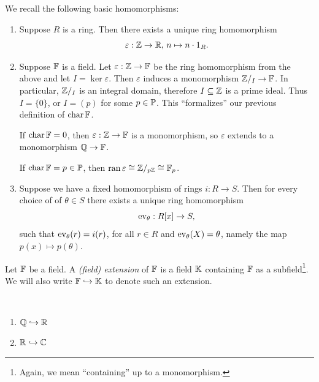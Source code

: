\begin{example}
    We recall the following basic homomorphisms:
    \begin{enumerate}
        \item Suppose $R$ is a ring. Then there exists a unique ring homomorphism
        \[
            \varepsilon : \Z \to \R, \, n \mapsto n \cdot 1_R.
        \]

        \item Suppose $\F$ is a field. Let $\varepsilon : \Z \to \F$ be the ring homomorphism from the above and let $I = \ker \varepsilon$. Then $\varepsilon$ induces a monomorphism $\Z/_I \to \F$. In particular, $\Z/_I$ is an integral domain, therefore $I \subseteq \Z$ is a prime ideal. Thus $I = \{0\}$, or $I = (p)$ for some $p \in \P$. This ``formalizes'' our previous definition of $\characteristic \F$.
        
        If $\characteristic \F = 0$, then $\varepsilon : \Z \to \F$ is a monomorphism, so $\varepsilon$ extends to a monomorphism $\Q \to \F$.

        If $\characteristic \F = p \in \P$, then $\ran \varepsilon \cong \Z/_{p\Z} \cong \F_p$.

        \item Suppose we have a fixed homomorphism of rings $i : R \to S$. Then for every choice of of $\theta \in S$ there exists a unique ring homomorphism
        \[
            \ev_\theta : R[x] \to S,
        \]
        such that $\ev_\theta(r) = i(r)$, for all $r \in R$ and $\ev_\theta(X) = \theta$, namely the map $p(x) \mapsto p(\theta)$.
    \end{enumerate}
\end{example}

\begin{definition}
    Let $\F$ be a field. A \emph{(field) extension} of $\F$ is a field $\K$ containing $\F$ as a subfield\footnote{Again, we mean ``containing'' up to a monomorphism.}. We will also write $\F \hookrightarrow \K$ to denote such an extension.
\end{definition}

\begin{example}{\ }
    \begin{enumerate}
        \item $\Q \hookrightarrow \R$
        \item $\R \hookrightarrow \C$
    \end{enumerate}
\end{example}

